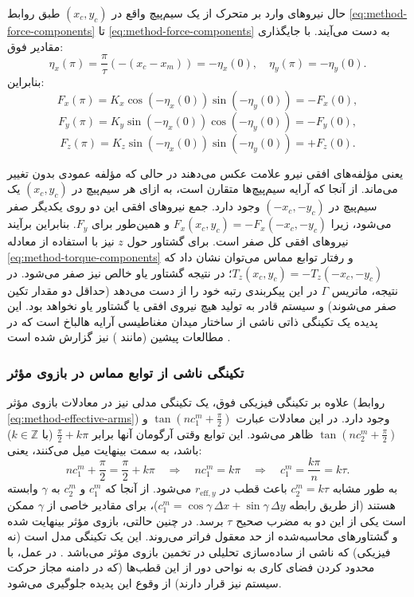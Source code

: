 حال نیروهای وارد بر متحرک از یک سیم‌پیچ واقع در $(x_c, y_c)$ طبق روابط \ref{eq:method-force-components} تا \ref{eq:method-force-components} به دست می‌آیند. با جایگذاری مقادیر فوق:
\[
\eta_x(\pi) = \frac{\pi}{\tau}(- (x_c - x_m)) = -\eta_x(0),\quad
\eta_y(\pi) = -\eta_y(0).
\]
بنابراین:
\[
F_x(\pi) = K_x \cos(-\eta_x(0)) \sin(-\eta_y(0)) = -F_x(0),
\]
\[
F_y(\pi) = K_y \sin(-\eta_x(0)) \cos(-\eta_y(0)) = -F_y(0),
\]
\[
F_z(\pi) = K_z \sin(-\eta_x(0)) \sin(-\eta_y(0)) = +F_z(0).
\]

یعنی مؤلفه‌های افقی نیرو علامت عکس می‌دهند در حالی که مؤلفه عمودی بدون تغییر می‌ماند. از آنجا که آرایه سیم‌پیچ‌ها متقارن است، به ازای هر سیم‌پیچ در $(x_c, y_c)$ یک سیم‌پیچ در $(-x_c, -y_c)$ وجود دارد. جمع نیروهای افقی این دو روی یکدیگر صفر می‌شود، زیرا $F_x(x_c, y_c) = -F_x(-x_c, -y_c)$ و همین‌طور برای $F_y$. بنابراین برآیند نیروهای افقی کل صفر است. برای گشتاور حول $z$ نیز با استفاده از معادله \ref{eq:method-torque-components} و رفتار توابع مماس می‌توان نشان داد که $T_z(x_c, y_c) = -T_z(-x_c, -y_c)$؛ در نتیجه گشتاور یاو خالص نیز صفر می‌شود. در نتیجه، ماتریس $\Gamma$ در این پیکربندی رتبه خود را از دست می‌دهد (حداقل دو مقدار تکین صفر می‌شوند) و سیستم قادر به تولید هیچ نیروی افقی یا گشتاور یاو نخواهد بود. این پدیده یک تکینگی ذاتی ناشی از ساختار میدان مغناطیسی آرایه هالباخ است که در مطالعات پیشین (مانند \cite{RN10, RN39}) نیز گزارش شده است \cite{Hu2025, RN55}.

\subsubsection{تکینگی ناشی از توابع مماس در بازوی مؤثر}

علاوه بر تکینگی فیزیکی فوق، یک تکینگی مدلی نیز در معادلات بازوی مؤثر (روابط \ref{eq:method-effective-arms}) وجود دارد. در این معادلات عبارت $\tan\!\left(n c_1^m + \frac{\pi}{2}\right)$ و $\tan\!\left(n c_2^m + \frac{\pi}{2}\right)$ ظاهر می‌شود. این توابع وقتی آرگومان آنها برابر $\frac{\pi}{2} + k\pi$ (با $k \in \mathbb{Z}$) باشد، به سمت بینهایت میل می‌کنند، یعنی:
\[
n c_1^m + \frac{\pi}{2} = \frac{\pi}{2} + k\pi \quad\Longrightarrow\quad n c_1^m = k\pi \quad\Longrightarrow\quad c_1^m = \frac{k\pi}{n} = k\tau.
\]
به طور مشابه $c_2^m = k\tau$ باعث قطب در $r_{\text{eff},y}$ می‌شود. از آنجا که $c_1^m$ و $c_2^m$ به $\gamma$ وابسته هستند (از طریق رابطه $c_1^m = \cos\gamma\,\Delta x + \sin\gamma\,\Delta y$)، برای مقادیر خاصی از $\gamma$ ممکن است یکی از این دو به مضرب صحیح $\tau$ برسد. در چنین حالتی، بازوی مؤثر بینهایت شده و گشتاورهای محاسبه‌شده از حد معقول فراتر می‌روند. این یک تکینگی مدل است (نه فیزیکی) که ناشی از ساده‌سازی تحلیلی در تخمین بازوی مؤثر می‌باشد \cite{Ref_TangentSingularity}. در عمل، با محدود کردن فضای کاری به نواحی دور از این قطب‌ها (که در دامنه مجاز حرکت سیستم نیز قرار دارند) از وقوع این پدیده جلوگیری می‌شود.

